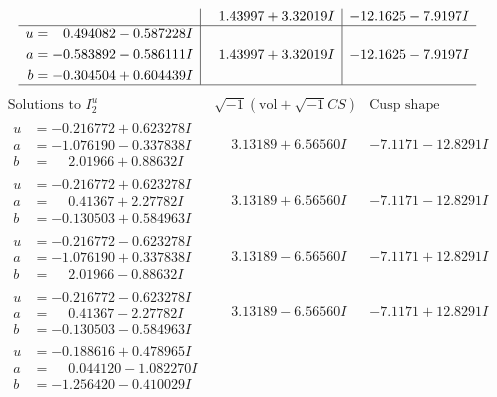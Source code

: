 \documentclass[1p]{elsarticle_modified}
\theoremstyle{definition}
\newcommand{\I}{\sqrt{-1}}
\begin{document}
$$\begin{array}{c|c|c}
 & \phantom{-}1.43997 + 3.32019 I & -12.1625 - 7.9197 I \\ \hline\begin{aligned}
u &= \phantom{-}0.494082 - 0.587228 I \\
a &= -0.583892 - 0.586111 I \\
b &= -0.304504 + 0.604439 I\end{aligned}
 & \phantom{-}1.43997 + 3.32019 I & -12.1625 - 7.9197 I\\
 \hline 
 \end{array}$$\newpage$$\begin{array}{c|c|c}  
\text{Solutions to }I^u_{2}& \I (\text{vol} + \sqrt{-1}CS) & \text{Cusp shape}\\
 \hline 
\begin{aligned}
u &= -0.216772 + 0.623278 I \\
a &= -1.076190 - 0.337838 I \\
b &= \phantom{-}2.01966 + 0.88632 I\end{aligned}
 & \phantom{-}3.13189 + 6.56560 I & -7.1171 - 12.8291 I \\ \hline\begin{aligned}
u &= -0.216772 + 0.623278 I \\
a &= \phantom{-}0.41367 + 2.27782 I \\
b &= -0.130503 + 0.584963 I\end{aligned}
 & \phantom{-}3.13189 + 6.56560 I & -7.1171 - 12.8291 I \\ \hline\begin{aligned}
u &= -0.216772 - 0.623278 I \\
a &= -1.076190 + 0.337838 I \\
b &= \phantom{-}2.01966 - 0.88632 I\end{aligned}
 & \phantom{-}3.13189 - 6.56560 I & -7.1171 + 12.8291 I \\ \hline\begin{aligned}
u &= -0.216772 - 0.623278 I \\
a &= \phantom{-}0.41367 - 2.27782 I \\
b &= -0.130503 - 0.584963 I\end{aligned}
 & \phantom{-}3.13189 - 6.56560 I & -7.1171 + 12.8291 I \\ \hline\begin{aligned}
u &= -0.188616 + 0.478965 I \\
a &= \phantom{-}0.044120 - 1.082270 I \\
b &= -1.256420 - 0.410029 I\end{aligned}

\end{array}$$
\end{document}

